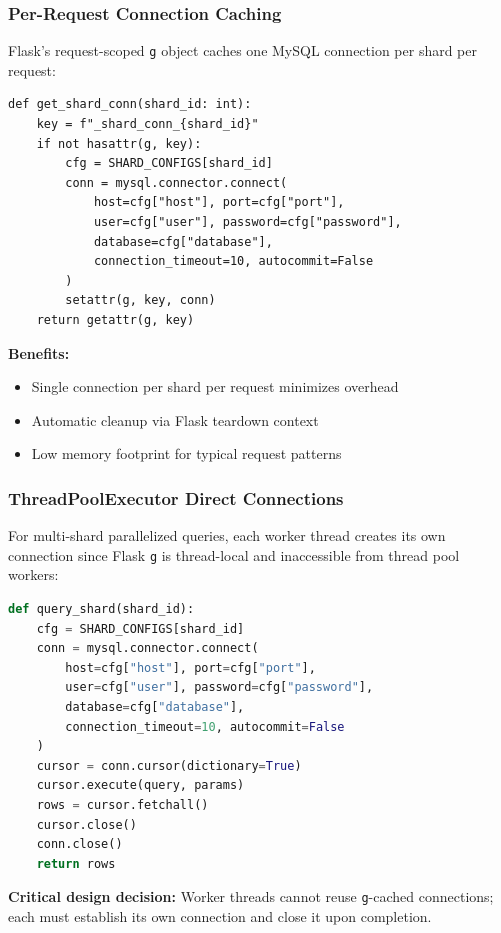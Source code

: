 \documentclass[conference]{IEEEtran}
\begin{document}
\subsubsection{Per-Request Connection Caching}

Flask's request-scoped \texttt{g} object caches one MySQL connection per shard per request:

\lstset{language=Python}
\begin{lstlisting}
def get_shard_conn(shard_id: int):
    key = f"_shard_conn_{shard_id}"
    if not hasattr(g, key):
        cfg = SHARD_CONFIGS[shard_id]
        conn = mysql.connector.connect(
            host=cfg["host"], port=cfg["port"],
            user=cfg["user"], password=cfg["password"],
            database=cfg["database"],
            connection_timeout=10, autocommit=False
        )
        setattr(g, key, conn)
    return getattr(g, key)
\end{lstlisting}

\textbf{Benefits:}
\begin{itemize}
    \item Single connection per shard per request minimizes overhead
    \item Automatic cleanup via Flask teardown context
    \item Low memory footprint for typical request patterns
\end{itemize}

\subsubsection{ThreadPoolExecutor Direct Connections}

For multi-shard parallelized queries, each worker thread creates its own connection since Flask \texttt{g} is thread-local and inaccessible from thread pool workers:

\begin{lstlisting}[language=Python]
def query_shard(shard_id):
    cfg = SHARD_CONFIGS[shard_id]
    conn = mysql.connector.connect(
        host=cfg["host"], port=cfg["port"],
        user=cfg["user"], password=cfg["password"],
        database=cfg["database"],
        connection_timeout=10, autocommit=False
    )
    cursor = conn.cursor(dictionary=True)
    cursor.execute(query, params)
    rows = cursor.fetchall()
    cursor.close()
    conn.close()
    return rows
\end{lstlisting}

\textbf{Critical design decision:} Worker threads cannot reuse \texttt{g}-cached connections; each must establish its own connection and close it upon completion.
\end{document}

